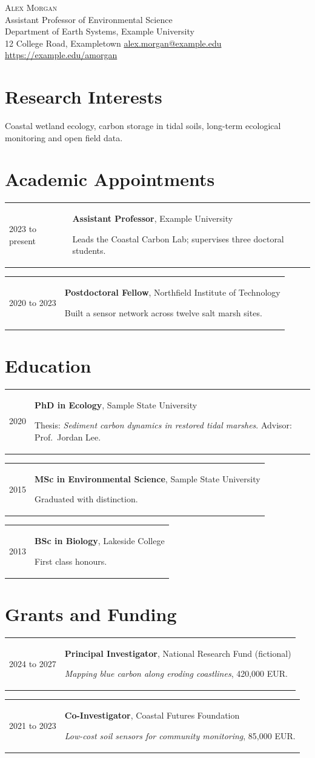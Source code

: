 \documentclass[11pt]{article}
\makeatletter
\newcommand{\entry}[4]{%
  \begin{tabularx}{\textwidth}{@{}p{2.6cm}X@{}}
    \small #1 & \textbf{#2}, #3\par\small #4
  \end{tabularx}\par\smallskip}
\makeatother
\begin{document}
\begin{center}
  {\Huge\scshape Alex Morgan}\\[1ex]
  Assistant Professor of Environmental Science\\
  Department of Earth Systems, Example University\\[0.5ex]
  \small 12 College Road, Exampletown \quad
  \href{mailto:alex.morgan@example.edu}{alex.morgan@example.edu} \quad
  \url{https://example.edu/amorgan}
\end{center}

\section{Research Interests}
Coastal wetland ecology, carbon storage in tidal soils, long-term ecological monitoring and open field data.

\section{Academic Appointments}
\entry{2023 to present}{Assistant Professor}{Example University}{Leads the Coastal Carbon Lab; supervises three doctoral students.}
\entry{2020 to 2023}{Postdoctoral Fellow}{Northfield Institute of Technology}{Built a sensor network across twelve salt marsh sites.}

\section{Education}
\entry{2020}{PhD in Ecology}{Sample State University}{Thesis: \emph{Sediment carbon dynamics in restored tidal marshes}. Advisor: Prof.\ Jordan Lee.}
\entry{2015}{MSc in Environmental Science}{Sample State University}{Graduated with distinction.}
\entry{2013}{BSc in Biology}{Lakeside College}{First class honours.}

\section{Grants and Funding}
\entry{2024 to 2027}{Principal Investigator}{National Research Fund (fictional)}{\emph{Mapping blue carbon along eroding coastlines}, 420,000 EUR.}
\entry{2021 to 2023}{Co-Investigator}{Coastal Futures Foundation}{\emph{Low-cost soil sensors for community monitoring}, 85,000 EUR.}
\end{document}
